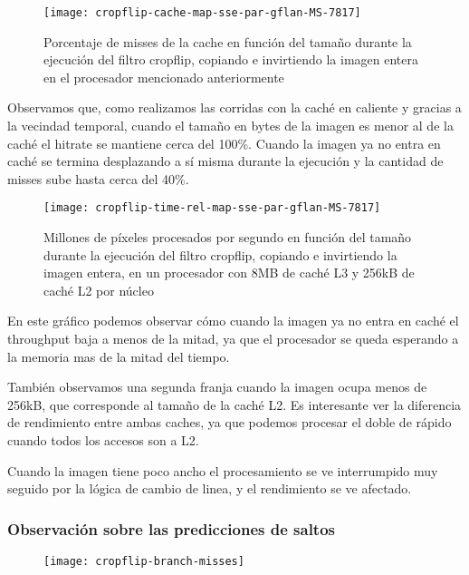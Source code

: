 \begin{figure}[H]
\centering
\texttt{[image: cropflip-cache-map-sse-par-gflan-MS-7817]}
\caption{Porcentaje de misses de la cache en función del tamaño durante la ejecución del filtro cropflip, copiando e invirtiendo la imagen entera en el procesador mencionado anteriormente}
\label{fig:cropflip-cache-map-sse_par-gflan-MS-7817}
\end{figure}


Observamos que, como realizamos las corridas con la caché en caliente y gracias a la vecindad temporal, cuando el tamaño en bytes de la imagen es menor al de la caché el hitrate se mantiene cerca del 100\%. Cuando la imagen ya no entra en caché se termina desplazando a sí misma durante la ejecución y la cantidad de misses sube hasta cerca del 40\%.

\begin{figure}[H]
\centering
\texttt{[image: cropflip-time-rel-map-sse-par-gflan-MS-7817]}
\caption{Millones de píxeles procesados por segundo en función del tamaño durante la ejecución del filtro cropflip, copiando e invirtiendo la imagen entera, en un procesador con 8MB de caché L3 y 256kB de caché L2 por núcleo}
\label{fig:cropflip-tame-rel-map-sse_par-gflan-MS-7817}
\end{figure}

En este gráfico podemos observar cómo cuando la imagen ya no entra en caché el throughput baja a menos de la mitad, ya que el procesador se queda esperando a la memoria mas de la mitad del tiempo.

También observamos una segunda franja cuando la imagen ocupa menos de 256kB, que corresponde al tamaño de la caché L2. Es interesante ver la diferencia de rendimiento entre ambas caches, ya que podemos procesar el doble de rápido cuando todos los accesos son a L2.

Cuando la imagen tiene poco ancho el procesamiento se ve interrumpido muy seguido por la lógica de cambio de linea, y el rendimiento se ve afectado.

\subsubsection{Observación sobre las predicciones de saltos}

\begin{figure}[H]
\centering
\texttt{[image: cropflip-branch-misses]}
\label{fig:cropflip-branch-misses}
\end{figure}

